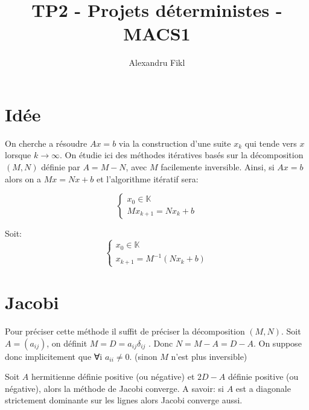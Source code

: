 \documentclass[a4paper,10pt]{article}
\title{TP2 - Projets déterministes - MACS1}
\author{Alexandru Fikl}
\begin{document}
\maketitle

\section{Idée}
On cherche a résoudre $Ax = b$ via la construction d'une suite $x_k$ qui tende vers
$x$ lorsque $k \rightarrow \infty$. On étudie ici des méthodes itératives basés sur
la décomposition $(M, N)$ définie par $A = M − N$, avec $M$ facilemente inversible.
Ainsi, si $Ax = b$ alors on a $Mx = Nx + b$ et l'algorithme itératif sera:

\[
\left\{
\begin{array}{c}
x_0 \in \mathbb{K} \\
Mx_{k + 1} = Nx_k + b
\end{array}
\right.
\]

Soit:
\[
\left\{
\begin{array}{c}
x_0 \in \mathbb{K} \\
x_{k+1} = M^{-1}(Nx_{k} + b)
\end{array}
\right.
\]

\section{Jacobi}

Pour préciser cette méthode il suffit de préciser la décomposition $(M, N)$. Soit
$A = (a_{ij})$, on définit $M = D = a_{ij} \delta_{ij}$ . Donc
$N = M − A = D − A$. On suppose donc implicitement que ∀i $a_{ii} \neq 0$. (sinon $M$
n'est plus inversible)

\begin{prop}
Soit $A$ hermitienne définie positive (ou négative) et $2D − A$ définie positive
(ou négative), alors la méthode de Jacobi converge. A savoir: si $A$ est a diagonale
strictement dominante sur les lignes alors Jacobi converge aussi.
\end{prop}
\end{document}
